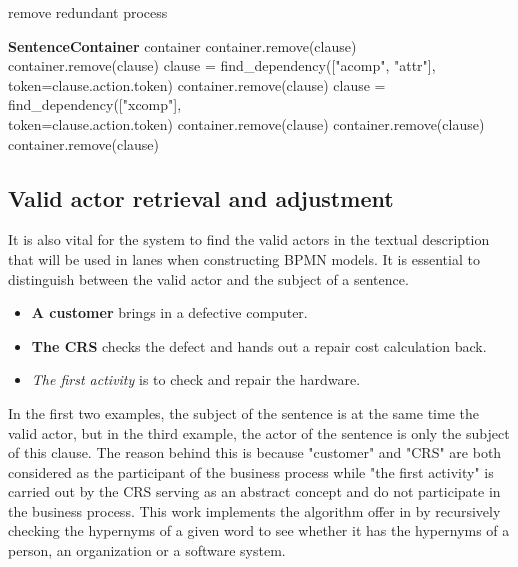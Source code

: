 \begin{algorithm}
\caption{remove redundant process}
\label{alg:11}
	\begin{algorithmic} [1]
		\REQUIRE \textbf{SentenceContainer} container
		\STATE container.remove(clause)
		\STATE container.remove(clause)
		\STATE clause = find\_dependency(["acomp", "attr"], \\ \qquad\qquad\qquad\qquad\qquad\qquad token=clause.action.token)
		\STATE container.remove(clause)
		\ENDIF
		\STATE clause = find\_dependency(["xcomp"], \\ \qquad\qquad\qquad\qquad\qquad\qquad token=clause.action.token)
		\STATE container.remove(clause)
		\ENDIF
		\STATE container.remove(clause)
		\STATE container.remove(clause)
		\ENDIF
		\ENDFOR
	\end{algorithmic}
\end{algorithm}

\subsection{Valid actor retrieval and adjustment}

It is also vital for the system to find the valid actors in the textual description that will be used in lanes when constructing BPMN models. It is essential to distinguish between the valid actor and the subject of a sentence. 

\begin{itemize}
    \item \textbf{A customer} brings in a defective computer.
    \item \textbf{The CRS} checks the defect and hands out a repair cost calculation back.
    \item \textit{The first activity} is to check and repair the hardware.
\end{itemize}

In the first two examples, the subject of the sentence is at the same time the valid actor, but in the third example, the actor of the sentence is only the subject of this clause. The reason behind this is because "customer" and "CRS" are both considered as the participant of the business process while "the first activity" is carried out by the CRS serving as an abstract concept and do not participate in the business process. This work implements the algorithm offer in \cite{t2m_1_main} by recursively checking the hypernyms of a given word to see whether it has the hypernyms of a person, an organization or a software system. 

